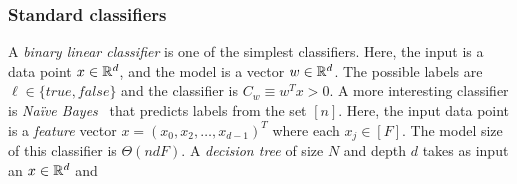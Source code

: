 \subsubsection*{Standard classifiers}
A {\em binary linear classifier} is one of the simplest classifiers. Here,
the input is a data point $x\in{\mathbb{R}}^d$,
and the model is a vector $w\in{\mathbb{R}}^d$.
 The possible labels are
$\ell\in\{\mathit{true},\mathit{false}\}$ and the classifier is
$C_w\equiv w^Tx>0$.
%
A more interesting classifier is {\em Na\"{i}ve Bayes}~\cite{shafindss} that predicts labels
from the set $[n]$.
Here, the input data point is a {\it feature}
vector $x=(x_0,x_2,\ldots,x_{d-1})^T$ where each $x_j\in [F]$.
The model size of this classifier is $\Theta(ndF)$.
%
A {\em decision tree} of size $N$ and depth $d$ takes as input an $x\in{\mathbb{R}}^d$
 and 
